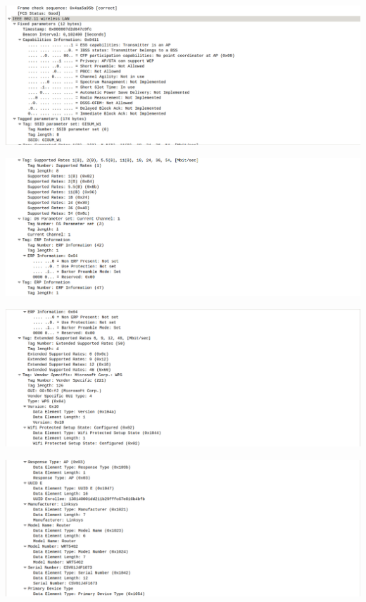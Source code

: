 \documentclass{article}
\begin{document}
\begin{center}
\includegraphics[scale=0.3]{WLAN/probres5.png}
\end{center}
\begin{center}
\includegraphics[scale=0.3]{WLAN/probres6.png}
\end{center}
\begin{center}
\includegraphics[scale=0.3]{WLAN/probres7.png}
\end{center}
\begin{center}
\includegraphics[scale=0.3]{WLAN/probres8.png}
\end{center}
\end{document}

